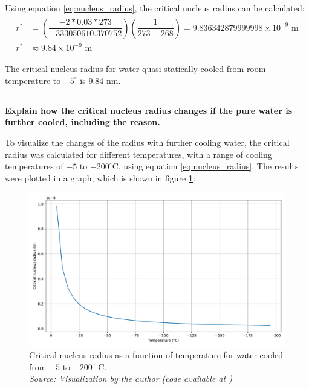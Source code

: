 Using equation \ref{eq:nucleus_radius}, the critical nucleus radius can be calculated:
\begin{align}
  \label{eq:radius}
  \begin{split}
    r^*&=\left(\dfrac{-2*0.03*273}{-333050610.370752}\right)\left(\dfrac{1}{273-268}\right)=9.836342879999998\times 10^{-9}\text{ m} \\ 
    r^*&\eqsim 9.84\times 10^{-9} \text{ m}
  \end{split}
\end{align}

\begin{mdframed}
The critical nucleus radius for water quasi-statically cooled from room temperature to $-5^{\circ}$ is 9.84 nm.
\end{mdframed}


\subsection{}
\textbf{Explain how the critical nucleus radius changes if the pure water is
further cooled, including the reason.}

To visualize the changes of the radius with further cooling water, the critical radius was calculated for different temperatures, with a range of cooling temperatures of $-5$ to $-200^{\circ}$C, using equation \ref{eq:nucleus_radius}. The results were plotted in a graph, which is shown in figure \ref{fig:critical_radius}:

\begin{figure}[h]
    \centering
    \includegraphics[width=1\textwidth]{graficas/critical_radius.pdf}
    \caption{Critical nucleus radius as a function of temperature for water cooled from $-5$ to $-200^{\circ}$ C. \\
    \textit{Source: Visualization by the author (code available at \citep{mygit})}}
    \label{fig:critical_radius}
\end{figure}

